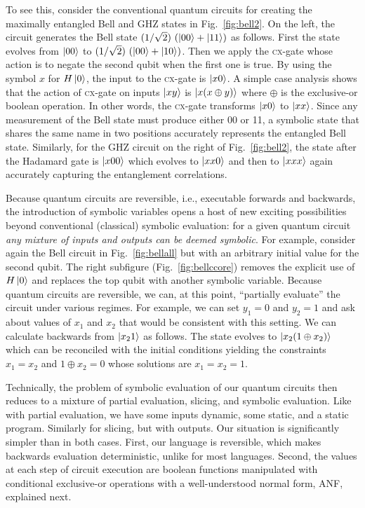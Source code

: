 \documentclass[sigplan,screen]{acmart}
\newcommand{\cx}{\textsc{cx}}
\theoremstyle{definition}
\begin{document}
To see this, consider the conventional quantum circuits for creating
the maximally entangled Bell and GHZ states in
Fig.~\ref{fig:bell2}. On the left, the circuit generates the Bell
state $(1/\sqrt{2})~ (\ket{00} + \ket{11})$ as follows. First the state
evolves from $\ket{00}$ to $(1/\sqrt{2})~ (\ket{00} + \ket{10})$. Then
we apply the \cx-gate whose action is to negate the second qubit when
the first one is true. By using the symbol $x$ for $H\ket{0}$, the
input to the \cx-gate is $\ket{x0}$. A simple case analysis shows that
the action of \cx-gate on inputs $\ket{xy}$ is $\ket{x(x \oplus y)}$
where $\oplus$ is the exclusive-or boolean operation. In other words,
the \cx-gate transforms $\ket{x0}$ to $\ket{xx}$. Since any
measurement of the Bell state must produce either 00 or 11,
a symbolic state that shares the same name in two positions
accurately represents the entangled Bell state. Similarly,
for the GHZ circuit on the right of Fig.~\ref{fig:bell2}, the state
after the Hadamard gate is $\ket{x00}$ which evolves to $\ket{xx0}$
and then to $\ket{xxx}$ again accurately capturing the entanglement
correlations.

Because quantum circuits are reversible, i.e., executable forwards
and backwards, the introduction of symbolic variables opens a host of
new exciting possibilities beyond conventional (classical) symbolic
evaluation: for a given quantum circuit \emph{any mixture of inputs and outputs
can be deemed symbolic}. For example, consider again the Bell circuit in
Fig.~\ref{fig:bellall} but with an arbitrary initial value for the second
qubit. The right subfigure (Fig.~\ref{fig:bellccore}) removes the
explicit use of $H\ket{0}$ and replaces the top qubit with another
symbolic variable. Because quantum circuits are reversible, we can, at
this point, ``partially evaluate'' the circuit under various
regimes. For example, we can set $y_1=0$ and $y_2=1$ and ask about
values of $x_1$ and $x_2$ that would be consistent with this
setting. We can calculate backwards from $\ket{x_21}$ as follows. The
state evolves to $\ket{x_2(1 \oplus x_2)}$ which can be reconciled
with the initial conditions yielding the constraints $x_1=x_2$ and
$1 \oplus x_2 = 0$ whose solutions are $x_1 = x_2 = 1$.

Technically, the problem of symbolic evaluation of our quantum
circuits then reduces to a mixture of partial evaluation, slicing, and
symbolic evaluation. Like with partial evaluation, we have some inputs
dynamic, some static, and a static program. Similarly for slicing, but
with outputs. Our situation is significantly simpler than in both
cases. First, our language is reversible, which makes backwards
evaluation deterministic, unlike for most languages. Second, the
values at each step of circuit execution are boolean functions
manipulated with conditional exclusive-or operations with a
well-understood normal form, ANF, explained next.
\end{document}
